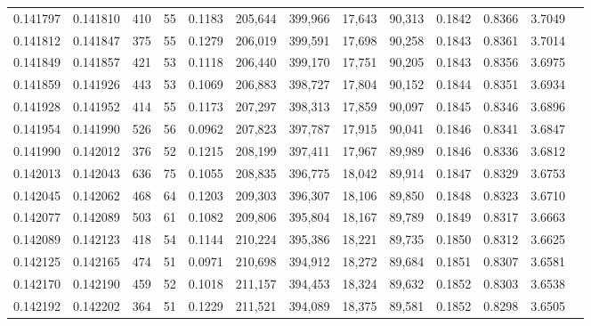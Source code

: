 \begin{tabular}{rrrrrrrrrrrrr}
0.141797 & 0.141810 &   410 &  55 &                                     0.1183 & 205,644 & 399,966 &  17,643 &  90,313 & 0.1842 & 0.8366 & 3.7049 \\
0.141812 & 0.141847 &   375 &  55 &                                     0.1279 & 206,019 & 399,591 &  17,698 &  90,258 & 0.1843 & 0.8361 & 3.7014 \\
0.141849 & 0.141857 &   421 &  53 &                                     0.1118 & 206,440 & 399,170 &  17,751 &  90,205 & 0.1843 & 0.8356 & 3.6975 \\
0.141859 & 0.141926 &   443 &  53 &                                     0.1069 & 206,883 & 398,727 &  17,804 &  90,152 & 0.1844 & 0.8351 & 3.6934 \\
0.141928 & 0.141952 &   414 &  55 &                                     0.1173 & 207,297 & 398,313 &  17,859 &  90,097 & 0.1845 & 0.8346 & 3.6896 \\
0.141954 & 0.141990 &   526 &  56 &                                     0.0962 & 207,823 & 397,787 &  17,915 &  90,041 & 0.1846 & 0.8341 & 3.6847 \\
0.141990 & 0.142012 &   376 &  52 &                                     0.1215 & 208,199 & 397,411 &  17,967 &  89,989 & 0.1846 & 0.8336 & 3.6812 \\
0.142013 & 0.142043 &   636 &  75 &                                     0.1055 & 208,835 & 396,775 &  18,042 &  89,914 & 0.1847 & 0.8329 & 3.6753 \\
0.142045 & 0.142062 &   468 &  64 &                                     0.1203 & 209,303 & 396,307 &  18,106 &  89,850 & 0.1848 & 0.8323 & 3.6710 \\
0.142077 & 0.142089 &   503 &  61 &                                     0.1082 & 209,806 & 395,804 &  18,167 &  89,789 & 0.1849 & 0.8317 & 3.6663 \\
0.142089 & 0.142123 &   418 &  54 &                                     0.1144 & 210,224 & 395,386 &  18,221 &  89,735 & 0.1850 & 0.8312 & 3.6625 \\
0.142125 & 0.142165 &   474 &  51 &                                     0.0971 & 210,698 & 394,912 &  18,272 &  89,684 & 0.1851 & 0.8307 & 3.6581 \\
0.142170 & 0.142190 &   459 &  52 &                                     0.1018 & 211,157 & 394,453 &  18,324 &  89,632 & 0.1852 & 0.8303 & 3.6538 \\
0.142192 & 0.142202 &   364 &  51 &                                     0.1229 & 211,521 & 394,089 &  18,375 &  89,581 & 0.1852 & 0.8298 & 3.6505 \\

\end{tabular}
